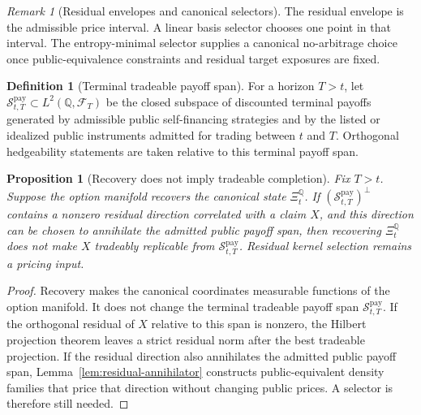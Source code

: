 \documentclass[11pt,a4paper]{amsart}
\theoremstyle{plain}
\newtheorem{proposition}[theorem]{Proposition}
\theoremstyle{definition}
\newtheorem{definition}[theorem]{Definition}
\theoremstyle{remark}
\newtheorem{remark}[theorem]{Remark}
\newcommand{\QQ}{\mathbb{Q}}
\newcommand{\cF}{\mathcal{F}}
\newcommand{\cS}{\mathcal{S}}
\begin{document}
\begin{remark}[Residual envelopes and canonical selectors]
The residual envelope is the admissible price interval.  A linear basis selector chooses one point
in that interval.  The entropy-minimal selector supplies a canonical no-arbitrage choice once
public-equivalence constraints and residual target exposures are fixed.
\end{remark}

\begin{definition}[Terminal tradeable payoff span]\label{def:terminal-tradeable-payoff-span}
For a horizon \(T>t\), let \(\cS_{t,T}^{\mathrm{pay}}\subset L^2(\QQ,\cF_T)\) be the closed
subspace of discounted terminal payoffs generated by admissible public self-financing strategies
and by the listed or idealized public instruments admitted for trading between \(t\) and \(T\).
Orthogonal hedgeability statements are taken relative to this terminal payoff span.
\end{definition}

\begin{proposition}[Recovery does not imply tradeable completion]\label{prop:recovery-not-completion}
Fix \(T>t\).  Suppose the option manifold recovers the canonical state \(\Xi_t^\QQ\).  If
\((\cS_{t,T}^{\mathrm{pay}})^\perp\) contains a nonzero residual direction correlated with a claim
\(X\), and this direction can be chosen to annihilate the admitted public payoff span, then
recovering \(\Xi_t^\QQ\) does not make \(X\) tradeably replicable from
\(\cS_{t,T}^{\mathrm{pay}}\).  Residual kernel selection remains a pricing input.
\end{proposition}

\begin{proof}
Recovery makes the canonical coordinates measurable functions of the option manifold.  It does
not change the terminal tradeable payoff span \(\cS_{t,T}^{\mathrm{pay}}\).  If the orthogonal
residual of \(X\) relative to this span is nonzero, the Hilbert projection theorem leaves a strict
residual norm after the best tradeable projection.  If the residual direction also annihilates the
admitted public payoff span, Lemma~\ref{lem:residual-annihilator} constructs public-equivalent
density families that price that direction without changing public prices.  A selector is
therefore still needed.
\end{proof}
\end{document}
